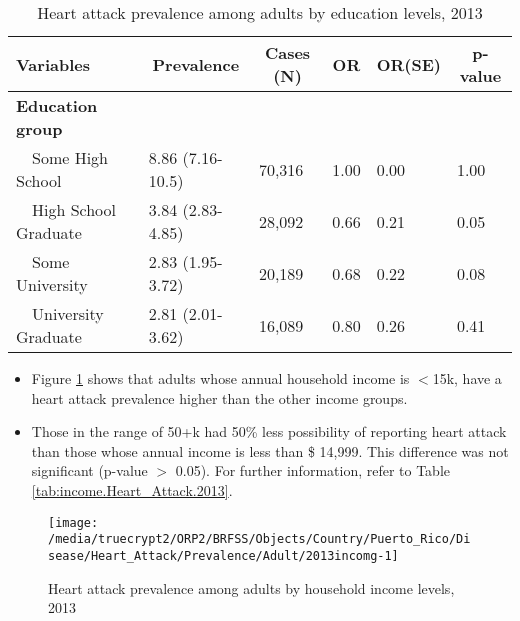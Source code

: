 \begin{table}[H]
\caption{Heart attack prevalence  among adults by education levels, 2013\label{tab:edu.Heart_Attack.2013}} 
\begin{center}
\begin{tabular}{llllll}
\hline\hline
\multicolumn{1}{l}{Variables}&\multicolumn{1}{c}{Prevalence}&\multicolumn{1}{c}{Cases (N)}&\multicolumn{1}{c}{OR}&\multicolumn{1}{c}{OR(SE)}&\multicolumn{1}{c}{p-value}\tabularnewline
\hline
{\bfseries Education group}&&&&&\tabularnewline
~~Some High School&8.86 (7.16-10.5)&70,316&1.00&0.00&1.00\tabularnewline
~~High School Graduate&3.84 (2.83-4.85)&28,092&0.66&0.21&0.05\tabularnewline
~~Some University&2.83 (1.95-3.72)&20,189&0.68&0.22&0.08\tabularnewline
~~University Graduate&2.81 (2.01-3.62)&16,089&0.80&0.26&0.41\tabularnewline
\hline
\end{tabular}\end{center}

\end{table}

 
 
 \newpage
\begin{itemize}

\item Figure \ref{fig:income.Heart_Attack.2013} shows that adults whose annual household income is 
$<$15k, have a heart attack prevalence higher than the other income groups.

\item Those in the range of 50+k had 50\% less possibility of reporting heart attack than those whose annual income is less than \$ 14,999. This difference was not significant (p-value $>$ 0.05).  For further information, refer to Table \ref{tab:income.Heart_Attack.2013}.

\end{itemize}

\begin{figure}[H]
\caption{Heart attack prevalence among adults by household income levels, 
         2013}
\begin{knitrout}
\color{fgcolor}

{\centering \texttt{[image: /media/truecrypt2/ORP2/BRFSS/Objects/Country/Puerto\_Rico/Disease/Heart\_Attack/Prevalence/Adult/2013incomg-1]} 

}



\end{knitrout}
 \label{fig:income.Heart_Attack.2013}
\end{figure}

